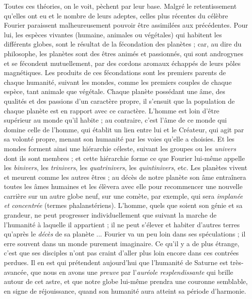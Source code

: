 \documentclass[a4paper, 11pt, oneside, landscape]{article}
\begin{document}
Toutes ces théories, on le voit, pèchent par leur base. Malgré le retentissement qu'elles ont eu et le nombre de leurs adeptes, celles plus récentes du célèbre Fourier paraissent malheureusement pouvoir être assimilées aux précédentes. Pour lui, les espèces vivantes (humaine, animales ou végétales) qui habitent les différents globes, sont le résultat de la fécondation des planètes ; car, au dire du philosophe, les planètes sont des êtres animés et passionnés, qui sont androgynes et se fécondent mutuellement, par des cordons aromaux échappés de leurs pôles magnétiques. Les produits de ces fécondations sont les premiers parents de chaque humanité, suivant les mondes, comme les premiers couples de chaque espèce, tant animale que végétale. Chaque planète possédant une âme, des qualités et des passions d'un caractère propre, il s'ensuit que la population de chaque planète est en rapport avec ce caractère. L'homme est loin d'être supérieur au monde qu'il habite ; au contraire, c'est l'âme de ce monde qui domine celle de l'homme, qui établit un lien entre lui et le Créateur, qui agit par sa volonté propre, menant son humanité par les voies qu'elle a choisies. Et les mondes forment ainsi une hiérarchie céleste, suivant les groupes ou les \emph{univers} dont ils sont membres ; et cette hiérarchie forme ce que Fourier lui-même appelle les \emph{binivers}, les \emph{trinivers}, les \emph{quatrinivers}, les \emph{quintinivers}, etc. Les planètes vivent et meurent comme les autres êtres ; au décès de notre planète son âme entraînera toutes les âmes humaines et les élèvera avec elle pour recommencer une nouvelle carrière sur un autre globe neuf, sur une comète, par exemple, qui sera \emph{implanée et concentrée} (termes phalanstériens). L'homme, quels que soient son génie et sa grandeur, ne peut progresser individuellement que suivant la marche de l'humanité à laquelle il appartient ; il ne peut s'élever et habiter d'autres terres qu'après le \emph{décès} de sa planète ... Fourier va un peu loin dans ses spéculations ; il erre souvent dans un monde purement imaginaire. Ce qu'il y a de plus étrange, c'est que ses disciples n'ont pas craint d'aller plus loin encore dans ces contrées perdues. Il en est qui prétendent aujourd'hui que l'humanité de Saturne est très-avancée, que nous en avons une \emph{preuve} par l'\emph{auréole resplendissante} qui brille autour de cet astre, et que notre globe lui-même prendra une couronne semblable, en signe de réjouissance, quand son humanité aura atteint sa période d'harmonie.
\end{document}
